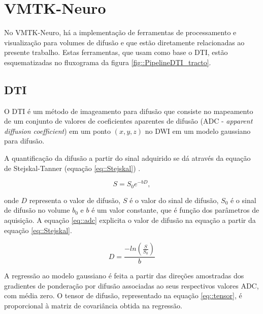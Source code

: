 \documentclass[
    12pt,                %
    oneside,            %
    a4paper,            %
    english,            %
    french,                %
    spanish,            %
    brazil                %
    ]{abntex2}
\begin{document}
\section{VMTK-Neuro}
\label{AlgoritmosVMTK}


No VMTK-Neuro, há a implementação de ferramentas de processamento e visualização para volumes de difusão e que estão diretamente relacionadas ao presente trabalho. Estas ferramentas, que usam como base o DTI, estão esquematizadas no fluxograma da figura \ref{fig::PipelineDTI_tracto}.

%

\pagebreak
\subsection{DTI}
O DTI é um método de imageamento para difusão que consiste no mapeamento de um conjunto de valores de coeficientes aparentes de difusão (ADC - \textit{apparent diffusion coefficient}) em um ponto $(x, y, z)$ no DWI em um modelo gaussiano para difusão. 

A quantificação da difusão a partir do sinal adquirido se dá através da equação de Stejskal-Tanner (equação \ref{eq::Stejskal}) \cite{DTI_Handbook}.

\begin{equation}
    S = S_0 e^{-bD},
    \label{eq::Stejskal}
\end{equation}

onde $D$ representa o valor de difusão, $S$ é o valor do sinal de difusão, $S_0$ é o sinal de difusão no volume $b_0$ e $b$ é um valor constante, que é função dos parâmetros de aquisição. A equação \ref{eq::adc} explicita o valor de difusão na equação a partir da equação \ref{eq::Stejskal}.

\begin{equation}
\label{eq::adc}
    D = \frac{-ln(\frac{S}{S_0})}{b}
\end{equation}

A regressão ao modelo gaussiano é feita a partir das direções amostradas dos gradientes de ponderação por difusão associadas ao seus respectivos valores ADC, com média zero. O tensor de difusão, representado na equação \ref{eq::tensor}, é proporcional à matriz de covariância obtida na regressão.
\end{document}
